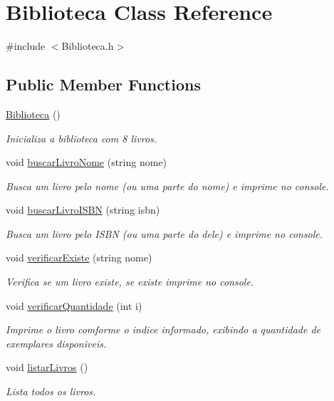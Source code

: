 \hypertarget{classBiblioteca}{}\section{Biblioteca Class Reference}
\label{classBiblioteca}


{\ttfamily \#include $<$Biblioteca.\+h$>$}

\subsection*{Public Member Functions}
\begin{DoxyCompactItemize}
\item 
\hyperlink{classBiblioteca_a5e12ea4e7a4edb14d210a41708fc1c10}{Biblioteca} ()
\begin{DoxyCompactList}\small\item\em Inicializa a biblioteca com 8 livros. \end{DoxyCompactList}\item 
void \hyperlink{classBiblioteca_a3a6b6ee72044e6aa2cd873d4a5433082}{buscar\+Livro\+Nome} (string nome)
\begin{DoxyCompactList}\small\item\em Busca um livro pelo nome (ou uma parte do nome) e imprime no console. \end{DoxyCompactList}\item 
void \hyperlink{classBiblioteca_a54d099facb49b728e398ef12b85d6c5e}{buscar\+Livro\+I\+S\+BN} (string isbn)
\begin{DoxyCompactList}\small\item\em Busca um livro pelo I\+S\+BN (ou uma parte do dele) e imprime no console. \end{DoxyCompactList}\item 
void \hyperlink{classBiblioteca_aa06628698e61fc2514a963be9447b92c}{verificar\+Existe} (string nome)
\begin{DoxyCompactList}\small\item\em Verifica se um livro existe, se existe imprime no console. \end{DoxyCompactList}\item 
void \hyperlink{classBiblioteca_a311c343ec2c1db2d58ac2836960b3914}{verificar\+Quantidade} (int i)
\begin{DoxyCompactList}\small\item\em Imprime o livro comforme o indice informado, exibindo a quantidade de exemplares disponiveis. \end{DoxyCompactList}\item 
void \hyperlink{classBiblioteca_a260219ed2739b3f78ce8046faa9219ad}{listar\+Livros} ()
\begin{DoxyCompactList}\small\item\em Lista todos os livros. \end{DoxyCompactList}\end{DoxyCompactItemize}


